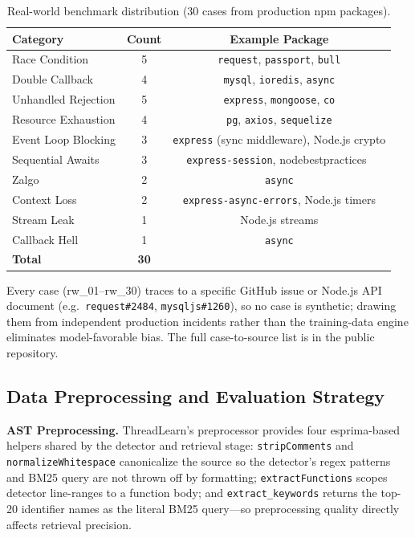 \documentclass[runningheads]{llncs}
\begin{document}
\begin{table}[tb]
  \centering
  \vspace{-0.3cm}
  \caption{Real-world benchmark distribution (30 cases from production npm packages).}
  \label{tab:benchmark}
  \begin{tabular}{@{}lcc@{}}
    \toprule
    \textbf{Category} & \textbf{Count} & \textbf{Example Package} \\
    \midrule
    Race Condition      & 5  & \texttt{request}, \texttt{passport}, \texttt{bull} \\
    Double Callback     & 4  & \texttt{mysql}, \texttt{ioredis}, \texttt{async} \\
    Unhandled Rejection & 5  & \texttt{express}, \texttt{mongoose}, \texttt{co} \\
    Resource Exhaustion & 4  & \texttt{pg}, \texttt{axios}, \texttt{sequelize} \\
    Event Loop Blocking & 3  & \texttt{express} (sync middleware), Node.js crypto \\
    Sequential Awaits   & 3  & \texttt{express-session}, nodebestpractices~\cite{nodebestpractices} \\
    Zalgo               & 2  & \texttt{async} \\
    Context Loss        & 2  & \texttt{express-async-errors}, Node.js timers \\
    Stream Leak         & 1  & Node.js streams \\
    Callback Hell       & 1  & \texttt{async} \\
    \midrule
    \textbf{Total}      & \textbf{30} & \\
    \bottomrule
  \end{tabular}
\end{table}

Every case (rw\_01--rw\_30) traces to a specific GitHub issue or Node.js
API document (e.g.\ \texttt{request\#2484}, \texttt{mysqljs\#1260}), so no
case is synthetic; drawing them from independent production incidents
rather than the training-data engine eliminates model-favorable bias.
The full case-to-source list is in the public repository.

\subsection{Data Preprocessing and Evaluation Strategy}
\label{sec:design:preprocess}

\textbf{AST Preprocessing.}
ThreadLearn's preprocessor provides four esprima-based~\cite{esprima}
helpers shared by the detector and retrieval stage:
\texttt{stripComments} and \texttt{normalizeWhitespace} canonicalize the
source so the detector's regex patterns and BM25 query are not thrown off
by formatting; \texttt{extractFunctions} scopes detector line-ranges to a
function body; and \texttt{extract\_keywords} returns the top-20 identifier
names as the literal BM25 query---so preprocessing quality directly affects
retrieval precision.
\end{document}
